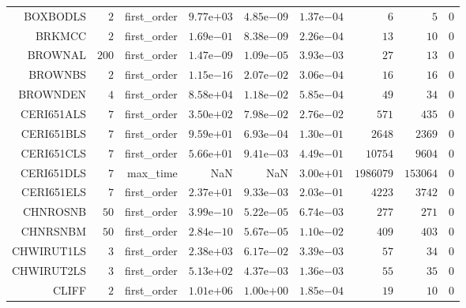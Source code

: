 \begin{longtable}{rrrrrrrrr}
BOXBODLS & \(     2\) & first\_order & \( 9.77\)e\(+03\) & \( 4.85\)e\(-09\) & \( 1.37\)e\(-04\) & \(     6\) & \(     5\) & \(     0\) \\
BRKMCC & \(     2\) & first\_order & \( 1.69\)e\(-01\) & \( 8.38\)e\(-09\) & \( 2.26\)e\(-04\) & \(    13\) & \(    10\) & \(     0\) \\
BROWNAL & \(   200\) & first\_order & \( 1.47\)e\(-09\) & \( 1.09\)e\(-05\) & \( 3.93\)e\(-03\) & \(    27\) & \(    13\) & \(     0\) \\
BROWNBS & \(     2\) & first\_order & \( 1.15\)e\(-16\) & \( 2.07\)e\(-02\) & \( 3.06\)e\(-04\) & \(    16\) & \(    16\) & \(     0\) \\
BROWNDEN & \(     4\) & first\_order & \( 8.58\)e\(+04\) & \( 1.18\)e\(-02\) & \( 5.85\)e\(-04\) & \(    49\) & \(    34\) & \(     0\) \\
CERI651ALS & \(     7\) & first\_order & \( 3.50\)e\(+02\) & \( 7.98\)e\(-02\) & \( 2.76\)e\(-02\) & \(   571\) & \(   435\) & \(     0\) \\
CERI651BLS & \(     7\) & first\_order & \( 9.59\)e\(+01\) & \( 6.93\)e\(-04\) & \( 1.30\)e\(-01\) & \(  2648\) & \(  2369\) & \(     0\) \\
CERI651CLS & \(     7\) & first\_order & \( 5.66\)e\(+01\) & \( 9.41\)e\(-03\) & \( 4.49\)e\(-01\) & \( 10754\) & \(  9604\) & \(     0\) \\
CERI651DLS & \(     7\) & max\_time &       NaN &       NaN & \( 3.00\)e\(+01\) & \(1986079\) & \(153064\) & \(     0\) \\
CERI651ELS & \(     7\) & first\_order & \( 2.37\)e\(+01\) & \( 9.33\)e\(-03\) & \( 2.03\)e\(-01\) & \(  4223\) & \(  3742\) & \(     0\) \\
CHNROSNB & \(    50\) & first\_order & \( 3.99\)e\(-10\) & \( 5.22\)e\(-05\) & \( 6.74\)e\(-03\) & \(   277\) & \(   271\) & \(     0\) \\
CHNRSNBM & \(    50\) & first\_order & \( 2.84\)e\(-10\) & \( 5.67\)e\(-05\) & \( 1.10\)e\(-02\) & \(   409\) & \(   403\) & \(     0\) \\
CHWIRUT1LS & \(     3\) & first\_order & \( 2.38\)e\(+03\) & \( 6.17\)e\(-02\) & \( 3.39\)e\(-03\) & \(    57\) & \(    34\) & \(     0\) \\
CHWIRUT2LS & \(     3\) & first\_order & \( 5.13\)e\(+02\) & \( 4.37\)e\(-03\) & \( 1.36\)e\(-03\) & \(    55\) & \(    35\) & \(     0\) \\
CLIFF & \(     2\) & first\_order & \( 1.01\)e\(+06\) & \( 1.00\)e\(+00\) & \( 1.85\)e\(-04\) & \(    19\) & \(    10\) & \(     0\) \\

\end{longtable}
